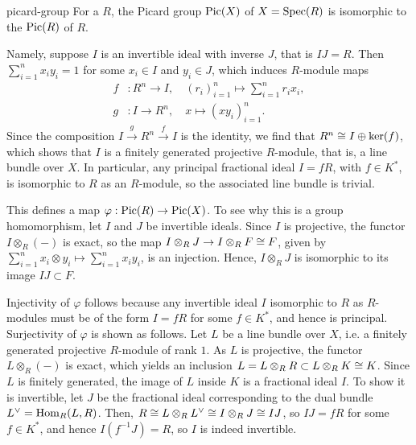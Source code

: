 \begin{example}{picard-group}
    For a  $R$, the Picard group $\textup{Pic}(X)$ of $X = \operatorname{Spec}(R)$ is isomorphic to the  $\textup{Pic}(R)$ of $R$.
    
    Namely, suppose $I$ is an invertible ideal with inverse $J$, that is $IJ = R$. Then $\sum_{i = 1}^{n} x_i y_i = 1$ for some $x_i \in I$ and $y_i \in J$, which induces $R$-module maps
    \[ \begin{aligned}
        f &: R^n \to I, \quad (r_i)_{i = 1}^{n} \mapsto \sum_{i = 1}^{n} r_i x_i , \\
        g &: I \to R^n, \quad x \mapsto (x y_i)_{i = 1}^{n} .
    \end{aligned} \]
    Since the composition $I \xrightarrow{g} R^n \xrightarrow{f} I$ is the identity, we find that $R^n \cong I \oplus \ker(f)$, which shows that $I$ is a finitely generated projective $R$-module, that is, a line bundle over $X$. In particular, any principal fractional ideal $I = fR$, with $f \in K^*$, is isomorphic to $R$ as an $R$-module, so the associated line bundle is trivial.
    
    This defines a map $\varphi : \textup{Pic}(R) \to \textup{Pic}(X)$. To see why this is a group homomorphism, let $I$ and $J$ be invertible ideals. Since $I$ is projective, the functor $I \otimes_R (-)$ is exact, so the map $I \otimes_R J \to I \otimes_R F \cong F$, given by $\sum_{i = 1}^{n} x_i \otimes y_i \mapsto \sum_{i = 1}^{n} x_i y_i$, is an injection. Hence, $I \otimes_R J$ is isomorphic to its image $IJ \subset F$.
    
    Injectivity of $\varphi$ follows because any invertible ideal $I$ isomorphic to $R$ as $R$-modules must be of the form $I = fR$ for some $f \in K^*$, and hence is principal. Surjectivity of $\varphi$ is shown as follows. Let $L$ be a line bundle over $X$, i.e. a finitely generated projective $R$-module of rank $1$. As $L$ is projective, the functor $L \otimes_R (-)$ is exact, which yields an inclusion $L = L \otimes_R R \subset L \otimes_R K \cong K$. Since $L$ is finitely generated, the image of $L$ inside $K$ is a fractional ideal $I$. To show it is invertible, let $J$ be the fractional ideal corresponding to the dual bundle $L^\vee = \operatorname{Hom}_R(L, R)$. Then, $R \cong L \otimes_R L^\vee \cong I \otimes_R J \cong IJ$, so $IJ = fR$ for some $f \in K^*$, and hence $I (f^{-1} J) = R$, so $I$ is indeed invertible.
\end{example}

